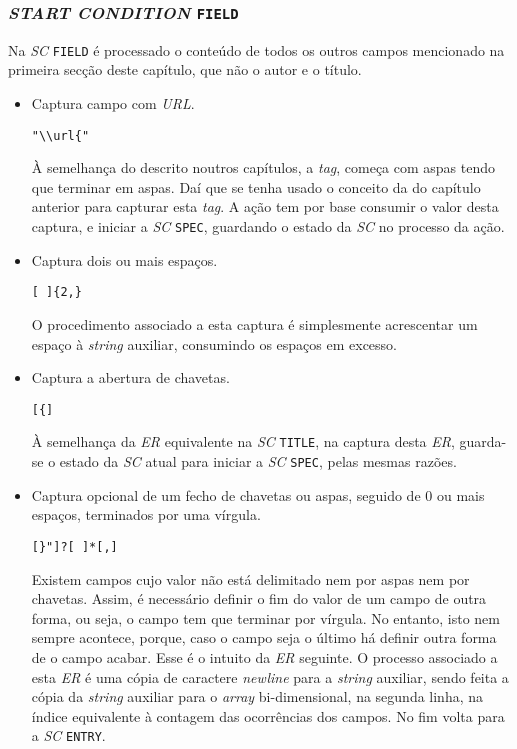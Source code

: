 \subsubsection{\emph{START CONDITION} \texttt{FIELD}}

Na \emph{SC} \texttt{FIELD} é processado o conteúdo de todos os outros campos
mencionado na primeira secção deste capítulo, que não o autor e o título.
\begin{itemize}
	\item Captura campo com \emph{URL}.  
\begin{verbatim}
"\\url{"
\end{verbatim}

À semelhança do descrito noutros capítulos, a \emph{tag}, começa com aspas tendo
que terminar em aspas. Daí que se tenha usado o conceito da do capítulo anterior
para capturar esta \emph{tag}. A ação tem por base consumir o valor desta
captura, e iniciar a \emph{SC} \texttt{SPEC}, guardando o estado da \emph{SC} no
processo da ação. 

\item Captura dois ou mais espaços.
\begin{verbatim}
[ ]{2,}
\end{verbatim}

O procedimento associado a esta captura é simplesmente acrescentar um espaço
à \emph{string} auxiliar, consumindo os espaços em excesso. 

\item Captura a abertura de chavetas.
\begin{verbatim}
[{]
\end{verbatim}

À semelhança da \emph{ER} equivalente na \emph{SC} \texttt{TITLE}, na captura
desta \emph{ER}, guarda-se o estado da \emph{SC} atual para iniciar
a \emph{SC} \texttt{SPEC}, pelas mesmas razões.     

\item Captura opcional de um fecho de chavetas ou aspas, seguido de 0 ou mais
	espaços, terminados por uma vírgula. 
\begin{verbatim}
[}"]?[ ]*[,]
\end{verbatim}

Existem campos cujo valor não está delimitado nem por aspas nem por chavetas.
Assim, é necessário definir o fim do valor de um campo de outra forma, ou seja,
o campo tem que terminar por vírgula. No entanto, isto nem sempre acontece,
porque, caso o campo seja o último há definir outra forma de o campo acabar.
Esse é o intuito da \emph{ER} seguinte. O processo associado a esta \emph{ER}
é uma cópia de caractere \emph{newline} para a \emph{string} auxiliar, sendo
feita a cópia da \emph{string} auxiliar para o \emph{array} bi-dimensional, na
segunda linha, na índice equivalente à contagem das ocorrências dos campos. No
fim volta para a \emph{SC} \texttt{ENTRY}.  


\end{itemize}
